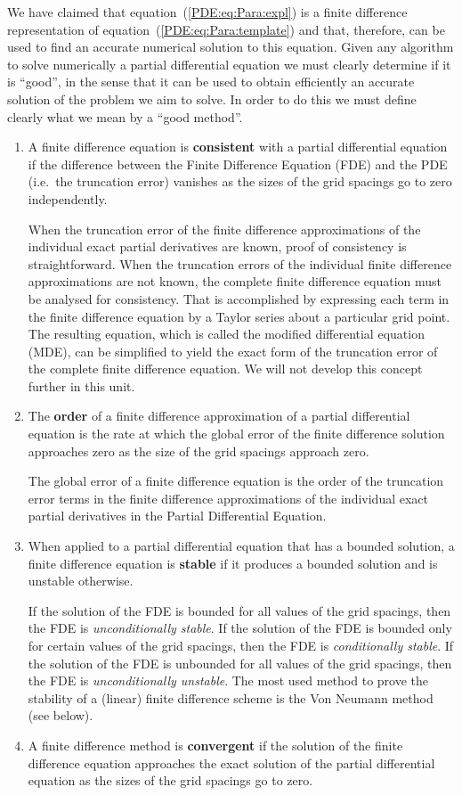 We have claimed that equation~(\ref{PDE:eq:Para:expl}) is a finite
difference representation of equation~(\ref{PDE:eq:Para:template}) and
that, therefore, can be used to find an accurate numerical solution to
this equation.  Given any algorithm to solve numerically a partial
differential equation we must clearly determine if it is ``good'', in
the sense that it can be used to obtain efficiently an accurate
solution of the problem we aim to solve.  In order to do this we must
define clearly what we mean by a ``good method''.

\begin{enumerate}
\item A finite difference equation is \textbf{consistent} with a
  partial differential equation if the difference between the Finite
  Difference Equation (FDE) and the PDE (i.e.\ the truncation error)
  vanishes as the sizes of the grid spacings go to zero independently.

  When the truncation error of the finite difference approximations of
  the individual exact partial derivatives are known, proof of
  consistency is straightforward. When the truncation errors of the
  individual finite difference approximations are not known, the
  complete finite difference equation must be analysed for
  consistency.  That is accomplished by expressing each term in the
  finite difference equation by a Taylor series about a particular
  grid point.  The resulting equation, which is called the modified
  differential equation (MDE), can be simplified to yield the exact
  form of the truncation error of the complete finite difference
  equation.  We will not develop this concept further in this unit.
\item The \textbf{order} of a finite difference approximation of a
  partial differential equation is the rate at which the global error
  of the finite difference solution approaches zero as the size of the
  grid spacings approach zero.

  The global error of a finite difference equation is the order of the
  truncation error terms in the finite difference approximations of
  the individual exact partial derivatives in the Partial Differential
  Equation.
\item When applied to a partial differential equation that has a
  bounded solution, a finite difference equation is \textbf{stable} if
  it produces a bounded solution and is unstable otherwise.

  If the solution of the FDE is bounded for all values of the grid
  spacings, then the FDE is \textit{unconditionally stable}.  If the
  solution of the FDE is bounded only for certain values of the grid
  spacings, then the FDE is \textit{conditionally stable}.  If the
  solution of the FDE is unbounded for all values of the grid
  spacings, then the FDE is \textit{unconditionally unstable}.  The
  most used method to prove the stability of a (linear) finite
  difference scheme is the Von Neumann method (see below).
\item A finite difference method is \textbf{convergent} if the
  solution of the finite difference equation approaches the exact
  solution of the partial differential equation as the sizes of the
  grid spacings go to zero.


\end{enumerate}
